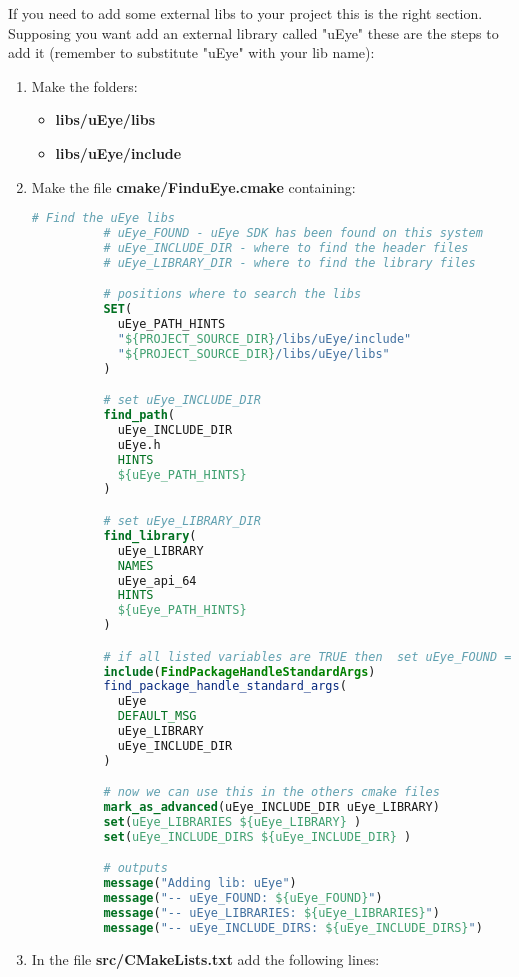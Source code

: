 If you need to add some external libs to your project this is the right
section. Supposing you want add an external library called "uEye" these
are the steps to add it (remember to substitute "uEye" with your lib
name):

\begin{enumerate}
  \def\labelenumi{\arabic{enumi}.}
  \item
        Make the folders:

        \begin{itemize}
          \item
                \textbf{libs/uEye/libs}
          \item
                \textbf{libs/uEye/include}
        \end{itemize}
  \item
        Make the file \textbf{cmake/FinduEye.cmake} containing:

        \begin{lstlisting}[language=cmake, gobble=10]
          # Find the uEye libs
          # uEye_FOUND - uEye SDK has been found on this system
          # uEye_INCLUDE_DIR - where to find the header files
          # uEye_LIBRARY_DIR - where to find the library files

          # positions where to search the libs
          SET(
            uEye_PATH_HINTS
            "${PROJECT_SOURCE_DIR}/libs/uEye/include"
            "${PROJECT_SOURCE_DIR}/libs/uEye/libs"
          )

          # set uEye_INCLUDE_DIR
          find_path(
            uEye_INCLUDE_DIR
            uEye.h
            HINTS
            ${uEye_PATH_HINTS}
          )

          # set uEye_LIBRARY_DIR
          find_library(
            uEye_LIBRARY
            NAMES
            uEye_api_64
            HINTS
            ${uEye_PATH_HINTS}
          )

          # if all listed variables are TRUE then  set uEye_FOUND = TRUE
          include(FindPackageHandleStandardArgs)
          find_package_handle_standard_args(
            uEye
            DEFAULT_MSG
            uEye_LIBRARY
            uEye_INCLUDE_DIR
          )

          # now we can use this in the others cmake files
          mark_as_advanced(uEye_INCLUDE_DIR uEye_LIBRARY)
          set(uEye_LIBRARIES ${uEye_LIBRARY} )
          set(uEye_INCLUDE_DIRS ${uEye_INCLUDE_DIR} )

          # outputs
          message("Adding lib: uEye")
          message("-- uEye_FOUND: ${uEye_FOUND}")
          message("-- uEye_LIBRARIES: ${uEye_LIBRARIES}")
          message("-- uEye_INCLUDE_DIRS: ${uEye_INCLUDE_DIRS}")
        \end{lstlisting}
  \item
        In the file \textbf{src/CMakeLists.txt} add the following lines:


\end{enumerate}
